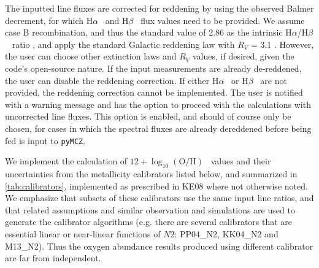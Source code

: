 \documentclass{emulateapj}
\newcommand{\oxabinline}{\ensuremath{12 + \log_{10}(\mathrm{O}/\mathrm{H})}}
\newcommand{\ha}{\ensuremath{\mathrm{H}\alpha}}
\newcommand{\hb}{\ensuremath{\mathrm{H}\beta}}
\begin{document}
The inputted line fluxes are corrected for reddening by using the
observed Balmer decrement, for which \ha~ and \hb~ flux values need to
be provided. We assume case B recombination, and thus the standard
value of 2.86 as the intrinsic \ha/\hb~ ratio \citep{osterbrock89},
and apply the standard Galactic reddening law with $R_V$ = 3.1
\citep{cardelli89}. However, the user can choose other extinction laws
and $R_V$ values, if desired, given the code's open-source nature. If
the input measurements are already de-reddened, the user can disable
the reddening correction. If either \ha~ or \hb~ are not provided, the
reddening correction cannot be implemented. The user is notified with
a warning message and has the option to proceed with the calculations
with uncorrected line fluxes. This option is enabled, and should of
course only be chosen, for cases in which the spectral fluxes are
already dereddened before being fed is input to \verb=pyMCZ=.

We implement the calculation of \oxabinline~ values and their
uncertainties from the metallicity calibrators listed below, and
summarized in \autoref{tab:calibrators}, implemented as prescribed
in KE08 where not otherwise noted. We emphasize that subsets of these
calibrators use the same input line ratios, and that related
assumptions and similar observation and simulations are used to
generate the calibrator algorithms (e.g. there are several calibrators
that are essential linear or near-linear functions of $N2$: PP04\_N2,
KK04\_N2 and M13\_N2). Thus the oxygen abundance results produced
using different calibrator are far from independent.
\end{document}
